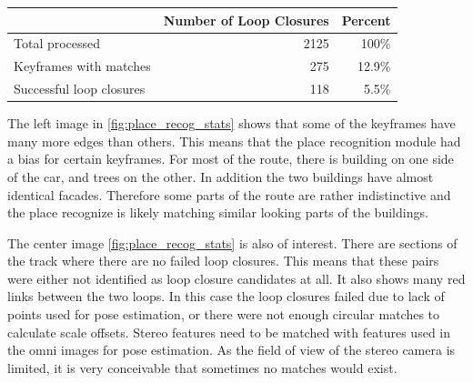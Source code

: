 \begin{table}[h]
  \centering
    \begin{tabular}{ p{5cm} r r} %
    \toprule
    & Number of Loop Closures & Percent \\
    \midrule
    Total processed           & 2125 & 100\% \\
    Keyframes with matches    & 275  & 12.9\% \\
    Successful loop closures  & 118  & 5.5\% \\
    \bottomrule
    \end{tabular}
  \label{tab:place_recog_stats}
\end{table}

The left image in \ref{fig:place_recog_stats} shows that some of the keyframes have many more edges than others.  This means that the place recognition module had a bias for certain keyframes.  For most of the route, there is building on one side of the car, and trees on the other.  In addition the two buildings have almost identical facades.  Therefore some parts of the route are rather indistinctive and the place recognize is likely matching similar looking parts of the buildings.

The center image \ref{fig:place_recog_stats} is also of interest.  There are sections of the track where there are no failed loop closures.  This means that these pairs were either not identified as loop closure candidates at all.  It also shows many red links between the two loops.  In this case the loop closures failed due to lack of points used for pose estimation, or there were not enough circular matches to calculate scale offsets.  Stereo features need to be matched with features used in the omni images for pose estimation.  As the field of view of the stereo camera is limited, it is very conceivable that sometimes no matches would exist.

